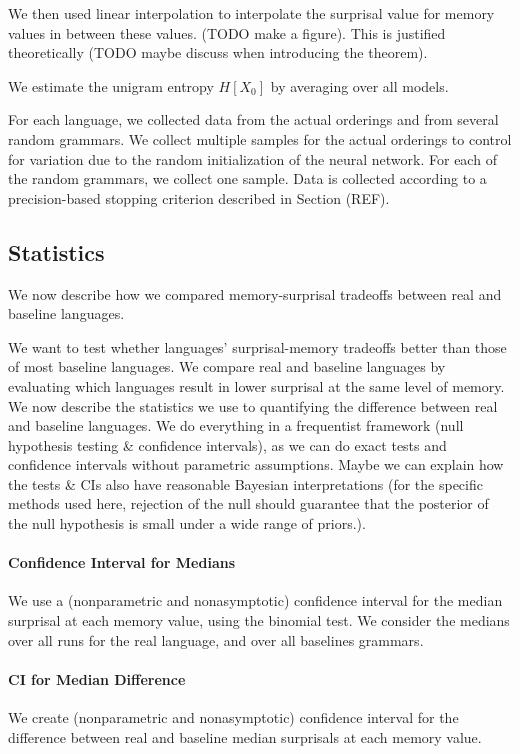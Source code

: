 \documentclass[11pt,letterpaper]{article}
\newcounter{theorem}
\begin{document}
We then used linear interpolation to interpolate the surprisal value for memory values in between these values. (TODO make a figure).
This is justified theoretically (TODO maybe discuss when introducing the theorem).

We estimate the unigram entropy $H[X_0]$ by averaging over all models.


For each language, we collected data from the actual orderings and from several random grammars.
We collect multiple samples for the actual orderings to control for variation due to the random initialization of the neural network.
For each of the random grammars, we collect one sample.
Data is collected according to a precision-based stopping criterion described in Section (REF).


\subsection{Statistics}

We now describe how we compared memory-surprisal tradeoffs between real and baseline languages.


We want to test whether languages' surprisal-memory tradeoffs better than those of most baseline languages.
We compare real and baseline languages by evaluating which languages result in lower surprisal at the same level of memory.
We now describe the statistics we use to quantifying the difference between real and baseline languages.
We do everything in a frequentist framework (null hypothesis testing \& confidence intervals), as we can do exact tests and confidence intervals without parametric assumptions.
Maybe we can explain how the tests \& CIs also have reasonable Bayesian interpretations (for the specific methods used here, rejection of the null should guarantee that the posterior of the null hypothesis is small under a wide range of priors.).

\paragraph{Confidence Interval for Medians}
We use a (nonparametric and nonasymptotic) confidence interval for the median surprisal at each memory value, using the binomial test.
We consider the medians over all runs for the real language, and over all baselines grammars.



\paragraph{CI for Median Difference}
We create (nonparametric and nonasymptotic) confidence interval for the difference between real and baseline median surprisals at each memory value.
\end{document}
